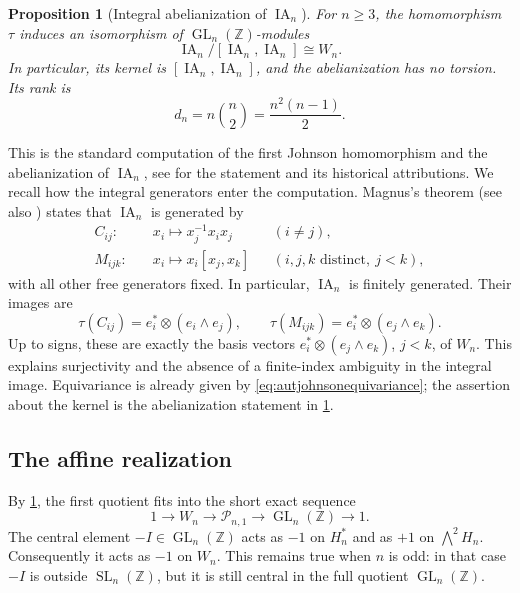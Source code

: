\documentclass[11pt,a4paper]{article}
\newtheorem{proposition}[theorem]{Proposition}
\theoremstyle{definition}
\newcommand{\Z}{\mathbb Z}
\newcommand{\SL}{\operatorname{SL}}
\newcommand{\GL}{\operatorname{GL}}
\begin{document}
\begin{proposition}[Integral abelianization of
\(\operatorname{IA}_n\)]\label{prop:iaabelianization}
For \(n\ge3\), the homomorphism \(\tau\) induces an isomorphism
of \(\GL_n(\Z)\)-modules
\[
 \operatorname{IA}_n/[\operatorname{IA}_n,\operatorname{IA}_n]
       \cong W_n.
\]
In particular, its kernel is
\([\operatorname{IA}_n,\operatorname{IA}_n]\), and the
abelianization has no torsion. Its rank is
\[
 d_n=n\binom n2=\frac{n^2(n-1)}2.
\]
\end{proposition}

This is the standard computation of the first Johnson
homomorphism and the abelianization of \(\operatorname{IA}_n\),
see \cite[Sections~4.2--4.3.1, especially equation~(4.3)]{SatohSurvey}
for the statement and its historical attributions. We recall how
the integral generators enter the computation. Magnus's theorem
\cite[Section~6]{Magnus1935} (see also
\cite[Theorem~4.1]{SatohSurvey}) states that
\(\operatorname{IA}_n\) is generated by
\[
 \begin{aligned}
 C_{ij}:&\quad x_i\longmapsto x_j^{-1}x_ix_j
       &&(i\ne j),\\
 M_{ijk}:&\quad x_i\longmapsto x_i[x_j,x_k]
       &&(i,j,k\text{ distinct},\ j<k),
 \end{aligned}
\]
with all other free generators fixed. In particular,
\(\operatorname{IA}_n\) is finitely generated. Their images
are
\[
 \tau(C_{ij})=e_i^*\otimes(e_i\wedge e_j),
 \qquad
 \tau(M_{ijk})=e_i^*\otimes(e_j\wedge e_k).
\]
Up to signs, these are exactly the basis vectors
\(e_i^*\otimes(e_j\wedge e_k)\), \(j<k\), of \(W_n\).
This explains surjectivity and the absence of a finite-index
ambiguity in the integral image. Equivariance is already given
by \eqref{eq:autjohnsonequivariance}; the assertion about the
kernel is the abelianization statement in
\cref{prop:iaabelianization}.

\subsection{The affine realization}

By \cref{prop:iaabelianization}, the first quotient fits into the short exact sequence
\[
 1\longrightarrow W_n\longrightarrow\mathcal{P}_{n,1}
   \longrightarrow\GL_n(\Z)\longrightarrow1.
\]
The central element \(-I\in\GL_n(\Z)\) acts as \(-1\) on
\(H_n^*\) and as \(+1\) on \(\bigwedge^2H_n\). Consequently
it acts as \(-1\) on \(W_n\). This remains true when \(n\)
is odd: in that case \(-I\) is outside \(\SL_n(\Z)\), but it
is still central in the full quotient \(\GL_n(\Z)\).
\end{document}
